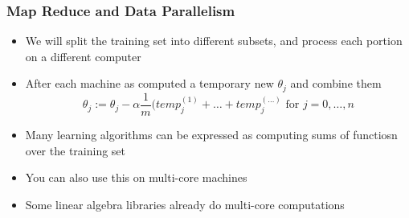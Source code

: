 \subsubsection{Map Reduce and Data Parallelism}
\begin{itemize}[--]
	\item We will split the training set into different subsets, and process each portion on a different computer
	\item After each machine as computed a temporary new $\theta_j$ and combine them 
		$$\theta_j := \theta_j - \alpha \frac{1}{m} (temp_j^{(1)}+\ldots+temp_j^{(\ldots)} \text{ for } j = 0,\ldots, n$$
	\item Many learning algorithms can be expressed as computing sums of functiosn over the training set
	\item You can also use this on multi-core machines
	\item Some linear algebra libraries already do multi-core computations
\end{itemize}